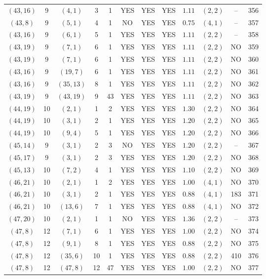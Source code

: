 \begin{longtable}{|c|c|c|c|c|c|c|c|c|c|c|c|}
$(43,16)$ & 9 & $(4,1)$ & 3 & 1 & YES & YES & YES & $1.11$ & $(2,2)$ & -- & 356\\
$(43,8)$ & 9 & $(5,1)$ & 4 & 1 & NO & YES & YES & $0.75$ & $(4,1)$ & -- & 357\\
$(43,16)$ & 9 & $(6,1)$ & 5 & 1 & YES & YES & YES & $1.11$ & $(2,2)$ & -- & 358\\
$(43,19)$ & 9 & $(7,1)$ & 6 & 1 & YES & YES & YES & $1.11$ & $(2,2)$ & NO & 359\\
$(43,19)$ & 9 & $(7,1)$ & 6 & 1 & YES & YES & YES & $1.11$ & $(2,2)$ & NO & 360\\
$(43,16)$ & 9 & $(19,7)$ & 6 & 1 & YES & YES & YES & $1.11$ & $(2,2)$ & NO & 361\\
$(43,16)$ & 9 & $(35,13)$ & 8 & 1 & YES & YES & YES & $1.11$ & $(2,2)$ & NO & 362\\
$(43,19)$ & 9 & $(43,19)$ & 9 & 43 & YES & YES & YES & $1.11$ & $(2,2)$ & NO & 363\\
$(44,19)$ & 10 & $(2,1)$ & 1 & 2 & YES & YES & YES & $1.30$ & $(2,2)$ & NO & 364\\
$(44,19)$ & 10 & $(3,1)$ & 2 & 1 & YES & YES & YES & $1.20$ & $(2,2)$ & NO & 365\\
$(44,19)$ & 10 & $(9,4)$ & 5 & 1 & YES & YES & YES & $1.20$ & $(2,2)$ & NO & 366\\
$(45,14)$ & 9 & $(3,1)$ & 2 & 3 & NO & YES & YES & $1.20$ & $(2,2)$ & -- & 367\\
$(45,17)$ & 9 & $(3,1)$ & 2 & 3 & YES & YES & YES & $1.20$ & $(2,2)$ & NO & 368\\
$(45,13)$ & 10 & $(7,2)$ & 4 & 1 & YES & YES & YES & $1.10$ & $(2,2)$ & NO & 369\\
$(46,21)$ & 10 & $(2,1)$ & 1 & 2 & YES & YES & YES & $1.00$ & $(4,1)$ & NO & 370\\
$(46,21)$ & 10 & $(3,1)$ & 2 & 1 & YES & YES & YES & $0.88$ & $(4,1)$ & 183 & 371\\
$(46,21)$ & 10 & $(13,6)$ & 7 & 1 & YES & YES & YES & $0.88$ & $(4,1)$ & NO & 372\\
$(47,20)$ & 10 & $(2,1)$ & 1 & 1 & NO & YES & YES & $1.36$ & $(2,2)$ & -- & 373\\
$(47,8)$ & 12 & $(7,1)$ & 6 & 1 & YES & YES & YES & $1.00$ & $(2,2)$ & NO & 374\\
$(47,8)$ & 12 & $(9,1)$ & 8 & 1 & YES & YES & YES & $0.88$ & $(2,2)$ & NO & 375\\
$(47,8)$ & 12 & $(35,6)$ & 10 & 1 & YES & YES & YES & $0.88$ & $(2,2)$ & 410 & 376\\
$(47,8)$ & 12 & $(47,8)$ & 12 & 47 & YES & YES & YES & $1.00$ & $(2,2)$ & NO & 377\\

\end{longtable}
